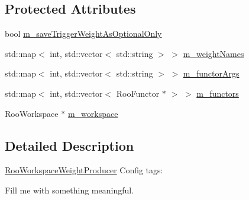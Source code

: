 \subsection*{Protected Attributes}
\begin{DoxyCompactItemize}
\item 
bool \hyperlink{classRooWorkspaceWeightProducer_a3b734d1238bd91580f7f86ba5e11f4ff}{m\_\-saveTriggerWeightAsOptionalOnly}
\item 
std::map$<$ int, std::vector$<$ std::string $>$ $>$ \hyperlink{classRooWorkspaceWeightProducer_a2e44c1348d34ed37d73fd5cad356f28a}{m\_\-weightNames}
\item 
std::map$<$ int, std::vector$<$ std::string $>$ $>$ \hyperlink{classRooWorkspaceWeightProducer_ac8bb8f7313dc398dd0ff966ee21ca2de}{m\_\-functorArgs}
\item 
std::map$<$ int, std::vector$<$ RooFunctor $\ast$ $>$ $>$ \hyperlink{classRooWorkspaceWeightProducer_a1b8f4af2c116a1b0e0eb25fbe46598e4}{m\_\-functors}
\item 
RooWorkspace $\ast$ \hyperlink{classRooWorkspaceWeightProducer_add3a4f23764c43521473e942b8231d85}{m\_\-workspace}
\end{DoxyCompactItemize}


\subsection{Detailed Description}
\hyperlink{classRooWorkspaceWeightProducer}{RooWorkspaceWeightProducer} Config tags:
\begin{DoxyItemize}
\item Fill me with something meaningful. 
\end{DoxyItemize}

